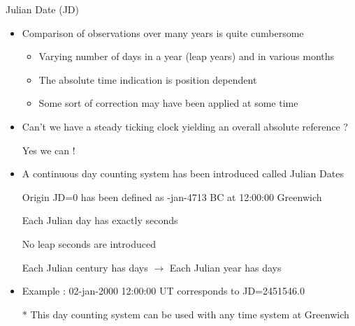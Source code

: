 \Tr
\begin{center}
{\red Julian Date (JD)}
\end{center}
%
\begin{itemize}
\item Comparison of observations over many years is quite cumbersome
\begin{itemize}
\item Varying number of days in a year (leap years) and in various months
\item The absolute time indication is position dependent
\item Some sort of correction may have been applied at some time
\end{itemize}
\item Can't we have a steady ticking clock yielding an overall absolute reference ?
\item[] Yes we can !
\item A {\blue continuous day counting system} has been introduced called {\blue Julian Dates}
\item[] {\blue Origin JD=0} has been defined as {-jan-4713 BC at 12:00:00 Greenwich}
\item[] Each {\blue Julian day} has exactly { seconds}
\item[] No leap seconds are introduced
\item[] Each {\blue Julian century} has { days} $\rightarrow$ Each {\blue Julian year} has { days}
\item Example : 02-jan-2000 12:00:00 UT corresponds to JD=2451546.0
\item[$\ast$] This day counting system can be used with any time system at Greenwich
\end{itemize}

